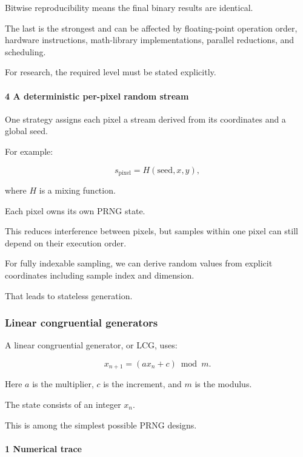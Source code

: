 Bitwise reproducibility means the final binary results are identical.

The last is the strongest and can be affected by floating-point operation order, hardware instructions, math-library implementations, parallel reductions, and scheduling.

For research, the required level must be stated explicitly.

\paragraph{4 A deterministic per-pixel random stream}\label{02-foundations-ii-ch029-a-deterministic-per-pixel-random-stream}

\hypertarget{02-foundations-ii-ch029-a-deterministic-per-pixel-random-stream}{}

One strategy assigns each pixel a stream derived from its coordinates and a global seed.

For example:

\[
 s_{\mathrm{pixel}}= H(\text{seed},x,y),
\]

where \(H\) is a mixing function.

Each pixel owns its own PRNG state.

This reduces interference between pixels, but samples within one pixel can still depend on their execution order.

For fully indexable sampling, we can derive random values from explicit coordinates including sample index and dimension.

That leads to stateless generation.

\subsubsection{Linear congruential generators}\label{02-foundations-ii-ch029-linear-congruential-generators}

\hypertarget{02-foundations-ii-ch029-linear-congruential-generators}{}

A linear congruential generator, or LCG, uses:

\[
 \boxed{ x_{n+1}=(ax_n+c)\bmod m }.
\]

Here \(a\) is the multiplier, \(c\) is the increment, and \(m\) is the modulus.

The state consists of an integer \(x_n\).

This is among the simplest possible PRNG designs.

\paragraph{1 Numerical trace}\label{02-foundations-ii-ch029-numerical-trace}

